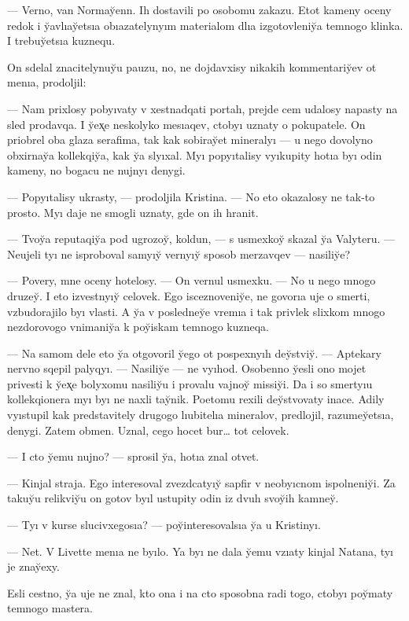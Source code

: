 \documentclass[10pt]{book}
\begin{document}
— Verno, van Normay̆enn. Ih dostavili po osobomu zakazu. Etot kameny oceny redok i y̆avlıay̆etsıa obıazatelynyım materialom dlıa izgotovleniy̆a temnogo klinka. I trebuy̆etsıa kuznequ.

On sdelal znacitelynuy̆u pauzu, no, ne dojdavxisy nikakih kommentariy̆ev ot menıa, prodoljil:

— Nam prixlosy pobyıvaty v xestnadqati portah, prejde cem udalosy napasty na sled prodavqa. I y̆ex̨e neskolyko mesıaqev, ctobyı uznaty o pokupatele. On priobrel oba glaza serafima, tak kak sobiray̆et mineralyı — u nego dovolyno obxirnay̆a kollekqiy̆a, kak y̆a slyıxal. Myı popyıtalisy vyıkupity hotıa byı odin kameny, no bogacu ne nujnyı denygi.

— Popyıtalisy ukrasty, — prodoljila Kristina. — No eto okazalosy ne tak-to prosto. Myı daje ne smogli uznaty, gde on ih hranit.

— Tvoy̆a reputaqiy̆a pod ugrozoy̆, koldun, — s usmexkoy̆ skazal y̆a Valyteru. — Neujeli tyı ne isproboval samyıy̆ vernyıy̆ sposob merzavqev — nasiliy̆e?

— Povery, mne oceny hotelosy. — On vernul usmexku. — No u nego mnogo druzey̆. I eto izvestnyıy̆ celovek. Ego isceznoveniy̆e, ne govorıa uje o smerti, vzbudorajilo byı vlasti. A y̆a v posledney̆e vremıa i tak privlek slixkom mnogo nezdorovogo vnimaniy̆a k poy̆iskam temnogo kuzneqa.

— Na samom dele eto y̆a otgovoril y̆ego ot pospexnyıh dey̆stviy̆. — Aptekary nervno sqepil palyqyı. — Nasiliy̆e — ne vyıhod. Osobenno y̆esli ono mojet privesti k y̆ex̨e bolyxomu nasiliy̆u i provalu vajnoy̆ missiy̆i. Da i so smertyıu kollekqionera myı byı ne naxli tay̆nik. Poetomu rexili dey̆stvovaty inace. Adily vyıstupil kak predstavitely drugogo lıubitelıa mineralov, predlojil, razumey̆etsıa, denygi. Zatem obmen. Uznal, cego hocet bur… tot celovek.

— I cto y̆emu nujno? — sprosil y̆a, hotıa znal otvet.

— Kinjal straja. Ego interesoval zvezdcatyıy̆ sapfir v neobyıcnom ispolneniy̆i. Za takuy̆u relikviy̆u on gotov byıl ustupity odin iz dvuh svoy̆ih kamney̆.

— Tyı v kurse slucivxegosıa? — poy̆interesovalsıa y̆a u Kristinyı.

— Net. V Livette menıa ne byılo. Ya byı ne dala y̆emu vzıaty kinjal Natana, tyı je znay̆exy.

Esli cestno, y̆a uje ne znal, kto ona i na cto sposobna radi togo, ctobyı poy̆maty temnogo mastera.
\end{document}
